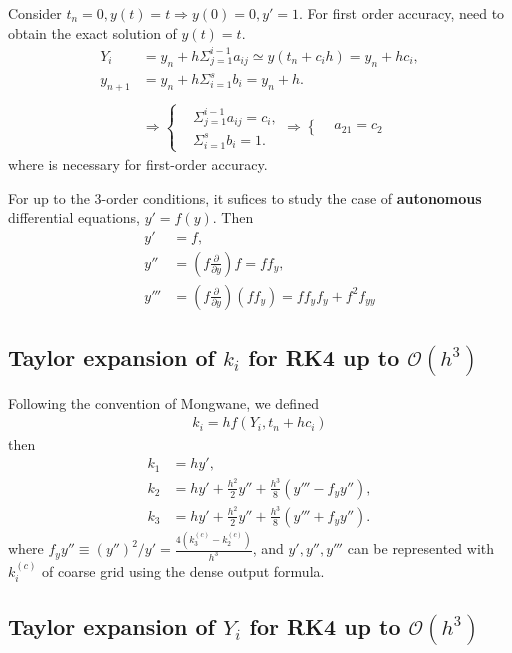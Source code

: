 \documentclass[prd,aps,a4paper,superscriptaddress,onecolumn,footinbib]{revtex4}
\begin{document}
Consider $t_n=0, y(t)=t \Rightarrow y(0)=0, y'=1$. For first order accuracy, need to obtain the exact
solution of $y(t)=t$.
\begin{align}
    Y_i
    &=y_n+h\Sigma_{j=1}^{i-1} a_{ij} \simeq y(t_n+c_ih) = y_n+hc_i, \\
    y_{n+1}
    &=y_n + h\Sigma_{i=1}^sb_i = y_n + h.
    \\~\nonumber\\
    &\Rightarrow
    \left\{
        \begin{matrix}
            &\Sigma_{j=1}^{i-1}a_{ij} = c_i, \\
            &\Sigma_{i=1}^sb_i = 1.
        \end{matrix}
    \right.
    \Rightarrow
    \left\{
        \begin{matrix}
            &a_{21} = c_2
        \end{matrix}
    \right.
\end{align}
where is necessary for first-order accuracy.

For up to the 3-order conditions, it sufices to study the case of \textbf{autonomous} differential equations, $y'=f(y)$. Then
\begin{align}
    y'&=f, \\
    y''&=(f\frac{\partial}{\partial y})f=ff_y, \\
    y'''&=(f\frac{\partial}{\partial y})(f f_y)=ff_yf_y+f^2f_{yy}
\end{align}

\subsection{Taylor expansion of $k_i$ for RK4 up to $\mathcal{O}(h^3)$}

Following the convention of Mongwane, we defined
\begin{align}
    k_i=hf(Y_i,t_n+hc_i)
\end{align}
then
\begin{align}
    k_1&=hy', \\
    k_2&=hy'+\frac{h^2}{2}y''+\frac{h^3}{8}(y'''-f_yy''), \\
    k_3&=hy'+\frac{h^2}{2}y''+\frac{h^3}{8}(y'''+f_yy'').
\end{align}
where $f_yy''\equiv\left(y''\right)^2/y'=\frac{4(k^{(c)}_3-k^{(c)}_2)}{h^3}$,
and $y',y'',y'''$ can be represented with $k^{(c)}_i$ of coarse grid using the dense output formula.

\subsection{Taylor expansion of $Y_i$ for RK4 up to $\mathcal{O}(h^3)$}
\end{document}
